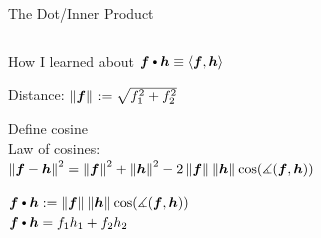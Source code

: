 \documentclass[10pt,compress,xcolor={usenames,dvipsnames},aspectratio=169]{beamer}
\begin{document}
\begin{frame}[label = dotproduct]{The Dot/Inner Product}
\begin{columns}
\begin{column}{0.5\textwidth}
How I learned about $\vf \bigcdot \vh \equiv \ip{\vf}{\vh}$
	
\begin{description}
\setlength{\itemsep}{3ex}
\item[Geometry] Distance: $\left \lVert \boldsymbol{f} \right \rVert_{{}} := \sqrt{f_1^2 + f_2^2}$

\item[Trigonometry] Define cosine \\
Law of cosines: \\
\hspace{-10ex}$\left \lVert \boldsymbol{f}-\boldsymbol{h} \right \rVert_{{}}^2 = \left \lVert \boldsymbol{f} \right \rVert_{{}}^2 + \left \lVert \boldsymbol{h} \right \rVert_{{}}^2 - 2 \left \lVert \boldsymbol{f} \right \rVert_{{}}\left \lVert \boldsymbol{h} \right \rVert_{{}}\cos(\measuredangle(\boldsymbol{f},\boldsymbol{h}))$

\item[Physics] $\vf \bigcdot \vh := \norm{\vf}\norm{\vh}\cos(\measuredangle(\vf,\vh))$ \\
$\vf \bigcdot \vh = f_1h_1 + f_2 h_2$
\end{description}
\end{column}
\begin{column}{0.5\textwidth}
\end{column}
\end{columns}
\end{frame}
\end{document}

